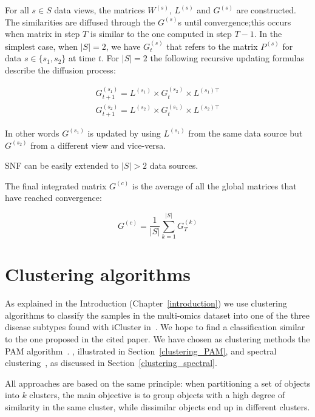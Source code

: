 For all $s\in S$ data views, the matrices $W^{(s)}$, $L^{(s)}$ and $G^{(s)}$ are constructed. The similarities are diffused through the $G^{(s)}$s until convergence;this occurs when matrix in step $T$ is similar to the one computed in step $T-1$.  
In the simplest case, when $|S|=2$, we have $G_t^{(s)}$ that refers to the matrix $P^{(s)}$ for data $s \in \{ s_1,s_2\}$ at time $t$.
For $|S|=2$ the following recursive updating formulas describe the diffusion process:

\begin{equation*}
    \begin{gathered}
        G^{(s_1)}_{t+1}=L^{(s_1)} \times G^{(s_2)}_{t} \times L^{(s_1)\top} \\
        G^{(s_2)}_{t+1}=L^{(s_2)} \times G^{(s_1)}_{t} \times L^{(s_2)\top}  
    \end{gathered}
\end{equation*}

In other words $G^{(s_1)}$ is updated by using $L^{(s_1)}$ from the same data source but $G^{(s_2)}$ from a different view and vice-versa.

SNF can be easily extended to $|S|>2$ data sources. \newline


The final integrated matrix $G^{(c)}$ is the average of all the global matrices that have reached convergence:

\begin{equation*}
    G^{(c)} = \frac{1}{|S|} \sum_{k=1}^{|S|} G_T^{(k)}
\end{equation*}


\section{Clustering algorithms}\label{methods_clustering}
As explained in the Introduction (Chapter~\ref{introduction}) we use clustering algorithms to classify the samples in the multi-omics dataset into one of the three disease subtypes found with iCluster in~\cite{shen2009integrative}. We hope to find a classification similar to the one proposed in the cited paper. We have chosen as clustering methods the PAM algorithm~\cite{PAM}.
, illustrated in Section~\ref{clustering_PAM}, and spectral clustering~\cite{von2007SP}, as discussed in Section~\ref{clustering_spectral}.

All approaches are based on the same principle: when partitioning a set of objects into $k$ clusters, the main objective is to group objects with a high degree of similarity in the same cluster, while dissimilar objects end up in different clusters.

